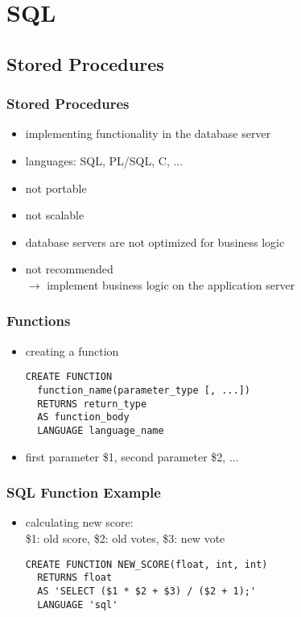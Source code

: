 \documentclass[dvipsnames]{beamer}
\theoremstyle{plain}
\begin{document}
\section{SQL}

\lstset{language=ExtendedSQL}

\subsection{Stored Procedures}

\begin{frame}
  \frametitle{Stored Procedures}

  \begin{itemize}
    \item implementing functionality in the database server
    \item languages: SQL, PL/SQL, C, ...

    \pause
    \bigskip
    \item not portable
    \pause
    \item not scalable
    \pause
    \item database servers are not optimized for business logic
    \pause
    \item \alert{not recommended}\\
      $\rightarrow$ implement business logic on the application server
  \end{itemize}
\end{frame}

\begin{frame}[fragile]
  \frametitle{Functions}

  \begin{itemize}
    \item creating a function
    \begin{lstlisting}
CREATE FUNCTION
  function_name(parameter_type [, ...])
  RETURNS return_type
  AS function_body
  LANGUAGE language_name
    \end{lstlisting}

    \medskip
    \item first parameter \$1, second parameter \$2, ...
  \end{itemize}
\end{frame}

\begin{frame}[fragile]
  \frametitle{SQL Function Example}

  \begin{itemize}
    \item calculating new score:\\
      \$1: old score, \$2: old votes, \$3: new vote

    \medskip
    \begin{lstlisting}
CREATE FUNCTION NEW_SCORE(float, int, int)
  RETURNS float
  AS 'SELECT ($1 * $2 + $3) / ($2 + 1);'
  LANGUAGE 'sql'
    \end{lstlisting}
  \end{itemize}
\end{frame}
\end{document}
